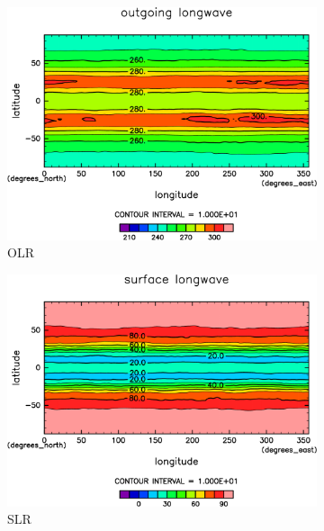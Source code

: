 \documentclass[body]{subfiles}
\begin{document}
\begin{figure}[t]
	\centering
	\begin{subfigure}{.4\textwidth}
		\centering
		\includegraphics[width=\columnwidth]{S1366-nc/OLR,time=3650:4015-crop-rotate.pdf}
		\caption{OLR \hmu*{[W/m^{-2}]}}\label{S1366ncOLR}
	\end{subfigure}
	\begin{subfigure}{.4\textwidth}
		\centering
		\includegraphics[width=\columnwidth]{S1366-nc/SLR,time=3650:4015-crop-rotate.pdf}
		\caption{SLR\hmu*{[W/m^{-2}]}}\label{S1366ncSLR}
	\end{subfigure}
	\begin{subfigure}{.4\textwidth}
		\centering

\end{subfigure}
\end{figure}
\end{document}
